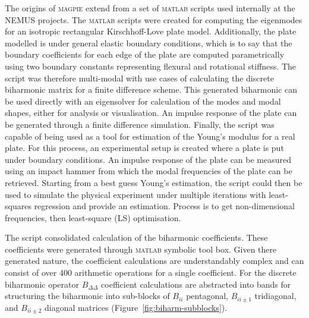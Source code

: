 The origins of \textsc{magpie} extend from a set of \textsc{matlab} scripts used internally at the NEMUS projects. The \textsc{matlab} scripts were created for computing the eigenmodes for an isotropic rectangular Kirschhoff-Love plate model. Additionally, the  plate modelled is under general elastic boundary conditions, which is to say that the boundary coefficients for each edge of the plate are computed parametrically using two boundary constants representing flexural and rotational stiffness.
The script was therefore multi-modal with use cases of calculating the discrete biharmonic matrix for a finite difference scheme. This generated biharmonic can be used directly with an eigensolver for calculation of the modes and modal shapes, either for analysis or visualisation.  An impulse response of the plate can be generated through a finite difference simulation. Finally, the script was capable of being used as a tool for estimation of the Young's modulus for a real plate. For this process, an experimental setup is created where a plate is put under boundary conditions. An impulse response of the plate can be measured using an impact hammer from which the modal frequencies of the plate can be retrieved. Starting from a best guess Young's estimation, the script could then be used to simulate the physical experiment under multiple iterations with least-squares regression and provide an estimation. Process is to get non-dimensional frequencies, then least-square (LS) optimisation.


    



The script consolidated calculation of the biharmonic coefficients. These coefficients were generated through \textsc{matlab} symbolic tool box. Given there generated nature, the coefficient calculations are understandably complex and can consist of over 400 arithmetic operations for a single coefficient. 
For the discrete biharmonic operator $B_{\Delta\Delta}$ coefficient calculations are abstracted into bands for structuring the biharmonic into sub-blocks of $B_{ii}$ pentagonal, $B_{ii\pm 1}$ tridiagonal, and $B_{ii\pm 2}$ diagonal matrices (Figure~\ref{fig:biharm-subblocks}). 

